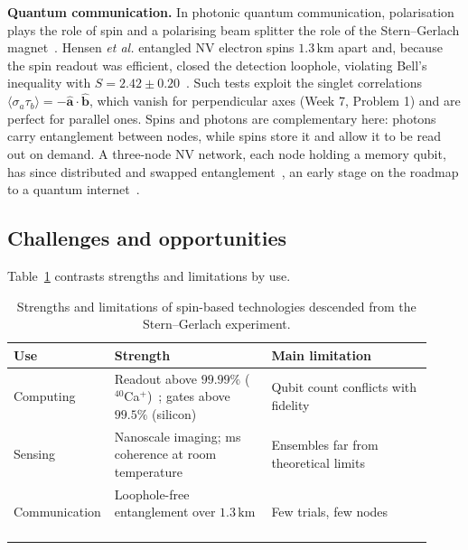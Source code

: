 \documentclass[12pt]{article}
\begin{document}
\textbf{Quantum communication.} In photonic quantum communication, polarisation plays the role of spin and a polarising beam splitter the role of the Stern--Gerlach magnet~\cite{sakurai2020}. Hensen \emph{et al.} entangled NV electron spins $1.3\,\mathrm{km}$ apart and, because the spin readout was efficient, closed the detection loophole, violating Bell's inequality with $S=2.42\pm0.20$~\cite{hensen2015}. Such tests exploit the singlet correlations $\langle\sigma_a\tau_b\rangle=-\hat{\mathbf a}\cdot\hat{\mathbf b}$, which vanish for perpendicular axes (Week 7, Problem 1) and are perfect for parallel ones. Spins and photons are complementary here: photons carry entanglement between nodes, while spins store it and allow it to be read out on demand. A three-node NV network, each node holding a memory qubit, has since distributed and swapped entanglement~\cite{pompili2021}, an early stage on the roadmap to a quantum internet~\cite{wehner2018}.

\subsection{Challenges and opportunities}

Table~\ref{tab:sg} contrasts strengths and limitations by use.

\begin{table}[H]
\centering\small
\renewcommand{\arraystretch}{1.25}
\begin{tabular}{@{}>{\raggedright\arraybackslash}p{0.17\linewidth}>{\raggedright\arraybackslash}p{0.37\linewidth}>{\raggedright\arraybackslash}p{0.38\linewidth}@{}}
\hline
\textbf{Use} & \textbf{Strength} & \textbf{Main limitation}\\
\hline
Computing & Readout above $99.99\%$ ($^{40}$Ca$^+$)~\cite{myerson2008}; gates above $99.5\%$ (silicon)~\cite{xue2022} & Qubit count conflicts with fidelity~\cite{philips2022}\\
Sensing & Nanoscale imaging; ms coherence at room temperature~\cite{rondin2014,balasubramanian2009} & Ensembles far from theoretical limits~\cite{barry2020}\\
Communication & Loophole-free entanglement over $1.3\,\mathrm{km}$~\cite{hensen2015} & Few trials, few nodes~\cite{hensen2015,pompili2021}\\
\hline
\end{tabular}
\caption{Strengths and limitations of spin-based technologies descended from the Stern--Gerlach experiment.}
\label{tab:sg}
\end{table}
\end{document}
